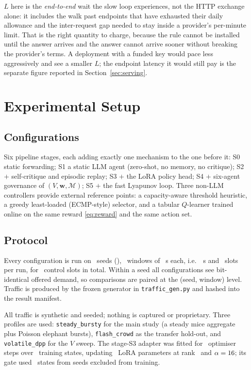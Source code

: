\documentclass[conference]{IEEEtran}
\newcommand{\wvec}{\mathbf{w}}
\begin{document}
$L$ here is the \emph{end-to-end} wait the slow loop experiences, not the HTTP
exchange alone: it includes the walk past endpoints that have exhausted their
daily allowance and the inter-request gap needed to stay inside a provider's
per-minute limit. That is the right quantity to charge, because the rule cannot
be installed until the answer arrives and the answer cannot arrive sooner without
breaking the provider's terms. A deployment with a funded key would pace less
aggressively and see a smaller $L$; the endpoint latency it would still pay is
the separate figure reported in Section~\ref{sec:serving}.

\section{Experimental Setup}\label{sec:setup}

\subsection{Configurations}
Six pipeline stages, each adding exactly one mechanism to the one before it:
S0 static forwarding; S1 a static LLM agent (zero-shot, no memory, no critique);
S2 $+$ self-critique and episodic replay; S3 $+$ the LoRA policy head;
S4 $+$ six-agent governance of $(V,\wvec,\mathcal{M})$; S5 $+$ the fast Lyapunov
loop. Three non-LLM controllers provide external reference points: a
capacity-aware threshold heuristic, a greedy least-loaded (ECMP-style) selector,
and a tabular $Q$-learner trained online on the same reward \eqref{eq:reward} and
the same action set.

\subsection{Protocol}
Every configuration is run on \ResSeeds~seeds (\ResSeedList), \ResWindows~windows of
\ResWindowSec~s each, i.e.\ \ResRunSec~s and \ResSlotsPerRun~slots per run, for
\ResTotalSlots~control slots in total. Within a seed all configurations see
bit-identical offered demand, so comparisons are paired at the (seed, window)
level. Traffic is produced by the frozen generator in \texttt{traffic\_gen.py} and
hashed into the result manifest.

All traffic is synthetic and seeded; nothing is captured or proprietary. Three
profiles are used: \texttt{steady\_bursty} for the main study (a steady mice
aggregate plus Poisson elephant bursts), \texttt{flash\_crowd} as the transfer
hold-out, and \texttt{volatile\_dpp} for the $V$ sweep. The stage-S3 adapter was
fitted for \ResAdapterSteps~optimiser steps over \ResAdapterTrainStates~training
states, updating \ResAdapterParams~LoRA parameters at rank \ResAdapterRank\ and
$\alpha=16$; its gate used \ResAdapterGateStates~states from seeds
excluded from training.
\end{document}
